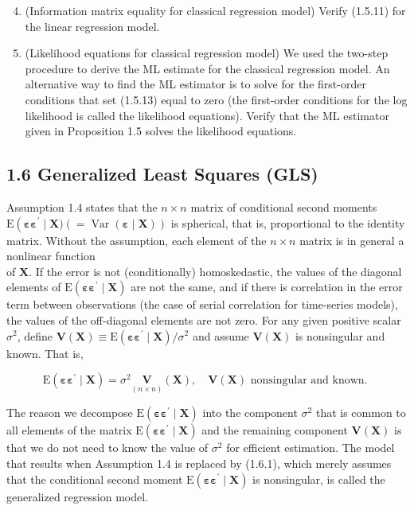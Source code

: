 \documentclass[10pt]{article}
\begin{document}
\begin{enumerate}
  \setcounter{enumi}{3}
  \item (Information matrix equality for classical regression model) Verify (1.5.11) for the linear regression model.
  \item (Likelihood equations for classical regression model) We used the two-step procedure to derive the ML estimate for the classical regression model. An alternative way to find the ML estimator is to solve for the first-order conditions that set (1.5.13) equal to zero (the first-order conditions for the log likelihood is called the likelihood equations). Verify that the ML estimator given in Proposition 1.5 solves the likelihood equations.
\end{enumerate}

\subsection*{1.6 Generalized Least Squares (GLS)}
Assumption 1.4 states that the $n \times n$ matrix of conditional second moments $\mathrm{E}\left(\boldsymbol{\varepsilon} \boldsymbol{\varepsilon}^{\prime} \mid\right. \mathbf{X})(=\operatorname{Var}(\boldsymbol{\varepsilon} \mid \mathbf{X}))$ is spherical, that is, proportional to the identity matrix. Without the assumption, each element of the $n \times n$ matrix is in general a nonlinear function\\
of $\mathbf{X}$. If the error is not (conditionally) homoskedastic, the values of the diagonal elements of $\mathrm{E}\left(\boldsymbol{\varepsilon} \boldsymbol{\varepsilon}^{\prime} \mid \mathbf{X}\right)$ are not the same, and if there is correlation in the error term between observations (the case of serial correlation for time-series models), the values of the off-diagonal elements are not zero. For any given positive scalar $\sigma^{2}$, define $\mathbf{V}(\mathbf{X}) \equiv \mathrm{E}\left(\boldsymbol{\varepsilon} \boldsymbol{\varepsilon}^{\prime} \mid \mathbf{X}\right) / \sigma^{2}$ and assume $\mathbf{V}(\mathbf{X})$ is nonsingular and known. That is,


\begin{equation*}
\mathrm{E}\left(\boldsymbol{\varepsilon} \boldsymbol{\varepsilon}^{\prime} \mid \mathbf{X}\right)=\sigma^{2} \underset{(n \times n)}{\mathbf{V}}(\mathbf{X}), \quad \mathbf{V}(\mathbf{X}) \text { nonsingular and known. } \tag{1.6.1}
\end{equation*}


The reason we decompose $\mathrm{E}\left(\boldsymbol{\varepsilon} \boldsymbol{\varepsilon}^{\prime} \mid \mathbf{X}\right)$ into the component $\sigma^{2}$ that is common to all elements of the matrix $\mathrm{E}\left(\boldsymbol{\varepsilon} \boldsymbol{\varepsilon}^{\prime} \mid \mathbf{X}\right)$ and the remaining component $\mathbf{V}(\mathbf{X})$ is that we do not need to know the value of $\sigma^{2}$ for efficient estimation. The model that results when Assumption 1.4 is replaced by (1.6.1), which merely assumes that the conditional second moment $\mathrm{E}\left(\boldsymbol{\varepsilon} \boldsymbol{\varepsilon}^{\prime} \mid \mathbf{X}\right)$ is nonsingular, is called the generalized regression model.
\end{document}
